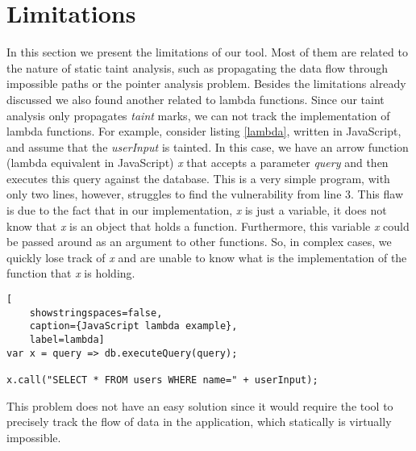 \section{Limitations}
\label{limitations}
In this section we present the limitations of our tool. Most of them are related to the nature of static taint analysis, such as propagating the data flow through impossible paths or the pointer analysis problem. Besides the limitations already discussed we also found another related to lambda functions. Since our taint analysis only propagates \textit{taint} marks, we can not track the implementation of lambda functions.
For example, consider listing \ref{lambda}, written in JavaScript, and assume that the \textit{userInput} is tainted. In this case, we have an arrow function (lambda equivalent in JavaScript) \textit{x} that accepts a parameter \textit{query} and then executes this query against the database. This is a very simple program, with only two lines, however, \toolname{} struggles to find the vulnerability from line 3. This flaw is due to the fact that in our implementation, \textit{x} is just a variable, it does not know that \textit{x} is an object that holds a function. Furthermore, this variable \textit{x} could be passed around as an argument to other functions. So, in complex cases, we quickly lose track of \textit{x} and are unable to know what is the implementation of the function that \textit{x} is holding.


\begin{lstlisting}[
    showstringspaces=false,
    caption={JavaScript lambda example},
    label=lambda]
var x = query => db.executeQuery(query);

x.call("SELECT * FROM users WHERE name=" + userInput);
\end{lstlisting}

This problem does not have an easy solution since it would require the tool to precisely track the flow of data in the application, which statically is virtually impossible.